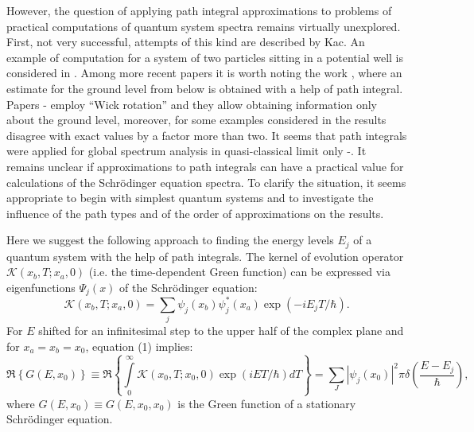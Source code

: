 \documentclass[11pt]{article}
\begin{document}
However, the question of applying path integral approximations to problems of practical
computations of quantum system spectra remains virtually unexplored.
First, not very successful, attempts of this kind are described by Kac\cite{13}.
An example of computation for a system of two particles sitting in a potential well
is considered in \cite{14}. Among more recent papers it is worth noting the work \cite{15}, where 
an estimate for the ground level from below is obtained with a help of path integral. Papers \cite{13}-\cite{15} employ ``Wick rotation'' and they allow obtaining information only about the ground level, moreover, for some examples
considered in \cite{13} the results disagree with exact values by a factor more than two. It seems that path integrals were applied for global spectrum analysis
in quasi-classical limit only \cite{16}-\cite{18}. It remains unclear if approximations to path integrals can have a practical value for calculations of
the Schr\"odinger equation spectra. To clarify the situation, it seems appropriate
to begin with simplest quantum systems and to investigate the influence of the path
types and of the order of approximations on the results.

Here we suggest the following approach to finding the energy levels
$E_j$ of a quantum system with the help of path integrals. The kernel of evolution
operator $\mathcal{K}(x_{b},T;x_{a},0)$ (i.e. the time-dependent Green function)
can be expressed via eigenfunctions $\Psi_j(x)$ of the Schr\"odinger equation:
\begin{equation}\label{eq1}
  \mathcal{K}(x_{b},T;x_{a},0)=\sum_j \psi_j(x_b)\psi_j^*(x_a)\exp(-iE_jT/\hbar).
\end{equation}
 For
$E$ shifted for an infinitesimal step to the upper half of the complex plane
and for $x_a=x_b=x_0$, equation (1) implies:
\begin{equation}\label{eq2}
  \Re\left\{
G(E,x_0)\right\}\equiv
\Re\left\{\int\limits_0^\infty\mathcal{K}(x_0,T;x_0,0)\exp(iET/\hbar)dT\right\}=
  \sum_J|\psi_j(x_0)|^2\pi\delta \left(\frac{E-E_j}{\hbar}\right),
\end{equation}
where $G(E,x_0)\equiv G(E,x_0,x_0)$ is the Green function of a stationary
Schr\"odinger equation.
\end{document}
